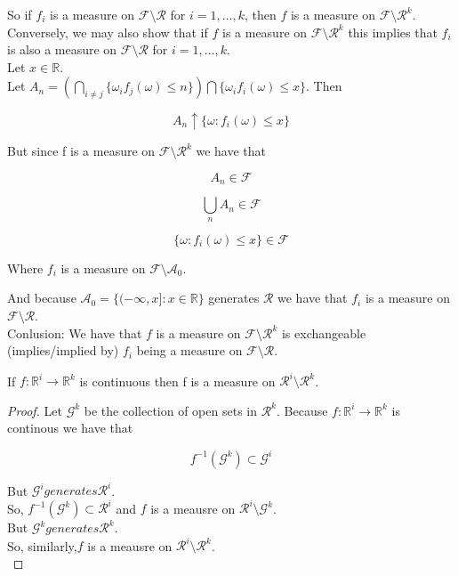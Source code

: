 \documentclass[11pt,fleqn]{book} %
\begin{document}
So if $f_i$ is a measure on $\mathcal{F}\setminus \mathcal{R}$ for $i = 1, \dots, k$, then $f$ is a measure on $\mathcal{F}\setminus \mathcal{R}^k$.\\

Conversely, we may also show that if $f$ is a measure on $\mathcal{F}\setminus \mathcal{R}^k$ this implies that $f_i$ is also a measure on $\mathcal{F}\setminus \mathcal{R}$ for $i = 1, \dots, k$.\\


Let $x \in \mathbb{R}$. \\

Let $A_n = (\bigcap_{i \neq j} \{\omega_i f_j (\omega) \leq n\}) \bigcap \{\omega_i f_i(\omega) \leq x\}$. Then
		
		$$A_n \uparrow \{\omega: f_i(\omega) \leq x\} $$


But since f is a measure on $\mathcal{F}\setminus \mathcal{R}^k$ we have that 

		$$A_n \in \mathcal{F} $$

		$$\bigcup_n A_n \in \mathcal{F}$$


		$$\{\omega: f_i(\omega) \leq x\} \in \mathcal{F}$$

Where $f_i$ is a measure on $\mathcal{F}\setminus \mathcal{A}_0$.

And because  $\mathcal{A}_0 = \{(-\infty, x]: x \in \mathbb{R}\}$ generates $\mathcal{R}$ we have that $f_i$ is a measure on $\mathcal{F}\setminus \mathcal{R}$.\\


Conlusion: We have that $f$ is a measure on $\mathcal{F}\setminus \mathcal{R}^k$ is exchangeable (implies/implied by) $f_i$ being a measure on $\mathcal{F}\setminus \mathcal{R}$.\\


\begin{theorem}
	If $f: \mathbb{R}^i \rightarrow \mathbb{R}^k$ is continuous then f is a measure on $\mathcal{R}^i \setminus \mathcal{R}^k$.
\end{theorem}
	

\begin{proof}
	Let $\mathcal{G}^k$ be the collection of open sets in $\mathcal{R}^k$. Because $f: \mathbb{R}^i \rightarrow \mathbb{R}^k$ is continous we have that 

			$$f^{-1}(\mathcal{G}^k) \subset \mathcal{G}^i $$

	But $\mathcal{G}^i generates \mathcal{R}^i$. \\

	So, $f^{-1}(\mathcal{G}^k) \subset \mathcal{R}^i$ and $f$ is a meausre on $\mathcal{R}^i\setminus \mathcal{G}^k$.\\

	But $\mathcal{G}^k generates \mathcal{R}^k$.\\

	So, similarly,$f$ is a meausre on $\mathcal{R}^i\setminus \mathcal{R}^k$.\\
\end{proof}
\end{document}
